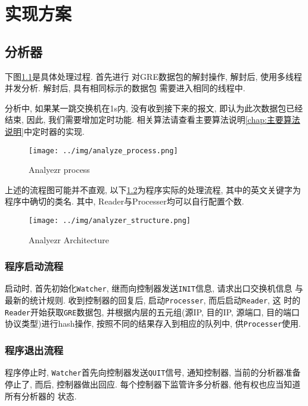 
\chapter{实现方案}
\label{chap:实现方案}

\section{分析器}

下图\ref{fig:analyzer_process}是具体处理过程. 首先进行
对GRE数据包的解封操作, 解封后, 使用多线程并发分析. 解封后,
具有相同标示的数据包 需要进入相同的线程中.

分析中, 如果某一跳交换机在1s内, 没有收到接下来的报文,
即认为此次数据包已经结束, 因此, 我们需要增加定时功能.
相关算法请查看主要算法说明\ref{chap:主要算法说明}中定时器的实现.

\begin{figure}
  \centering
  \texttt{[image: ../img/analyze\_process.png]}
  \caption{Analyezr process}
  \label{fig:analyzer_process}
\end{figure}

上述的流程图可能并不直观, 以下\ref{fig:analyzer_arch}为程序实际的处理流程,
其中的英文关键字为程序中确切的类名. 其中,
Reader与Processer均可以自行配置个数.

\begin{figure}
  \centering
  \texttt{[image: ../img/analyzer\_structure.png]}
  \caption{Analyezr Architecture}
  \label{fig:analyzer_arch}
\end{figure}

\subsection{程序启动流程}

启动时, 首先初始化\texttt{Watcher}, 继而向控制器发送\texttt{INIT}信息,
请求出口交换机信息 与最新的统计规则. 收到控制器的回复后,
启动\texttt{Processer}, 而后启动\texttt{Reader}, 这
时的\texttt{Reader}开始获取\texttt{GRE}数据包, 并根据内层的五元组(源IP,
目的IP, 源端口, 目的端口 协议类型)进行hash操作,
按照不同的结果存入到相应的队列中, 供\texttt{Processer}使用.

\subsection{程序退出流程}

程序停止时, \texttt{Watcher}首先向控制器发送\texttt{QUIT}信号,
通知控制器, 当前的分析器准备 停止了, 而后, 控制器做出回应.
每个控制器下监管许多分析器, 他有权也应当知道所有分析器的 状态.

